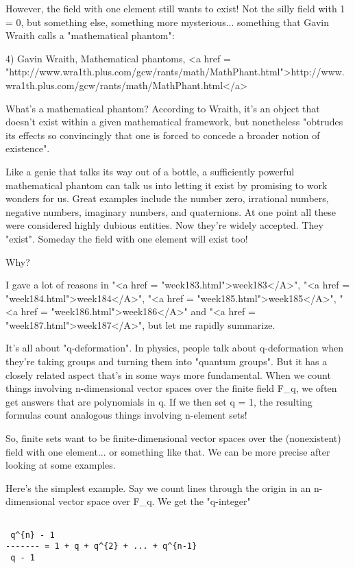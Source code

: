 However, the field with one element still wants to exist!  Not the
silly field with 1 = 0, but something else, something more mysterious...
something that Gavin Wraith calls a "mathematical phantom":
 
4) Gavin Wraith, Mathematical phantoms,
<a href = "http://www.wra1th.plus.com/gcw/rants/math/MathPhant.html">http://www.wra1th.plus.com/gcw/rants/math/MathPhant.html</a>

What's a mathematical phantom?  According to Wraith, it's an object 
that doesn't exist within a given mathematical framework, but 
nonetheless "obtrudes its effects so convincingly that one is forced 
to concede a broader notion of existence".

Like a genie that talks its way out of a bottle, a sufficiently powerful 
mathematical phantom can talk us into letting it exist by promising to
work wonders for us.  Great examples include the number zero, irrational
numbers, negative numbers, imaginary numbers, and quaternions.  At one 
point all these were considered highly dubious entities.  Now they're
widely accepted.  They "exist".  Someday the field with one element 
will exist too!

Why?

I gave a lot of reasons in "<a href = "week183.html">week183</A>", "<a href = "week184.html">week184</A>", "<a href = "week185.html">week185</A>", "<a href = "week186.html">week186</A>" 
and "<a href = "week187.html">week187</A>", but let me rapidly summarize.  

It's all about "q-deformation".  In physics, people talk
about q-deformation when they're taking groups and turning them into
"quantum groups".  But it has a closely related aspect
that's in some ways more fundamental.  When we count things involving
n-dimensional vector spaces over the finite field F_{q}, we
often get answers that are polynomials in q.  If we then set q = 1,
the resulting formulas count analogous things involving n-element
sets!

So, finite sets want to be finite-dimensional vector spaces over the 
(nonexistent) field with one element... or something like that.  We can
be more precise after looking at some examples.

Here's the simplest example.  Say we count lines through the origin 
in an n-dimensional vector space over F_{q}.   We get the "q-integer"


\begin{verbatim}

 q^{n} - 1
------- = 1 + q + q^{2} + ... + q^{n-1}
 q - 1
\end{verbatim}
    

